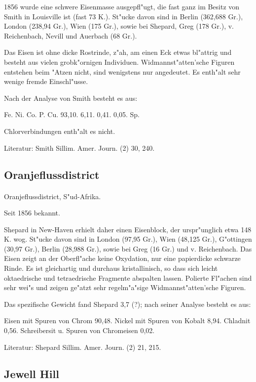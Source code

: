 \documentclass[a4paper, 11pt, oneside]{article}
\begin{document}
1856 wurde eine schwere Eisenmasse ausgepfl"ugt, die fast ganz im Besitz von Smith in Louisville ist (fast 73 K.). St"ucke davon sind in Berlin (362,688 Gr.), London (238,94 Gr.), Wien (175 Gr.), sowie bei Shepard, Greg (178 Gr.), v. Reichenbach, Nevill und Auerbach (68 Gr.).

Das Eisen ist ohne dicke Rostrinde, z"ah, am einen Eck etwas bl"attrig und besteht aus vielen grobk"ornigen Individuen. Widmannst"atten'sche Figuren entstehen beim "Atzen nicht, sind wenigstens nur angedeutet. Es enth"alt sehr wenige fremde Einschl"usse.

Nach der Analyse von Smith besteht es aus:

Fe. Ni. Co. P. Cu.  
93,10. 6,11. 0,41. 0,05. Sp.

Chlorverbindungen enth"alt es nicht.

Literatur: Smith Sillim. Amer. Journ. (2) 30, 240.

\subsection{Oranjeflussdistrict}
\normalsize
\paragraph{}
Oranjeflussdistrict, S"ud-Afrika.

Seit 1856 bekannt.

Shepard in New-Haven erhielt daher einen Eisenblock, der urspr"unglich etwa 148 K. wog. St"ucke davon sind in London (97,95 Gr.), Wien (48,125 Gr.), G"ottingen (30,97 Gr.), Berlin (28,988 Gr.), sowie bei Greg (16 Gr.) und v. Reichenbach. Das Eisen zeigt an der Oberfl"ache keine Oxydation, nur eine papierdicke schwarze Rinde. Es ist gleichartig und durchaus kristallinisch, so dass sich leicht oktaedrische und tetraedrische Fragmente abspalten lassen. Polierte Fl"achen sind sehr wei"s und zeigen ge"atzt sehr regelm"a"sige Widmannst"atten'sche Figuren.

Das spezifische Gewicht fand Shepard 3,7 (?); nach seiner Analyse besteht es aus:

Eisen mit Spuren von Chrom 90,48.  
Nickel mit Spuren von Kobalt 8,94.  
Chladnit 0,56.  
Schreibersit u. Spuren von Chromeisen 0,02.

Literatur: Shepard Sillim. Amer. Journ. (2) 21, 215.

\subsection{Jewell Hill}
\normalsize
\end{document}
